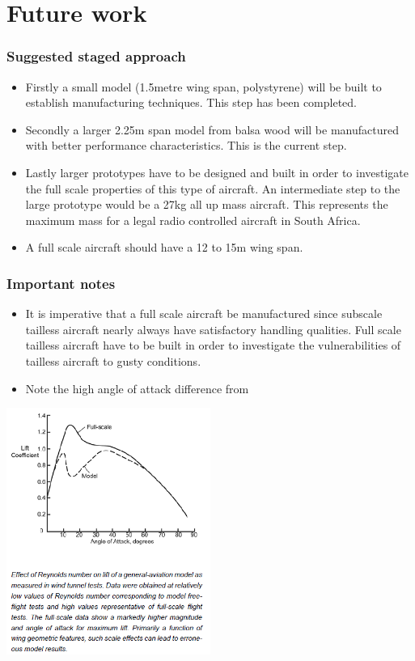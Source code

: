 \documentclass{beamer}
\begin{document}
\section{Future work}


\begin{frame}
\frametitle{Suggested staged approach}

\begin{itemize}
\item Firstly a small model (1.5metre wing span, polystyrene) will be built to establish manufacturing techniques.  This step has been completed.
\item Secondly a larger 2.25m span model from balsa wood will be manufactured with better performance characteristics.  This is the current step.
\item Lastly larger prototypes have to be designed and built in order to investigate the full scale properties of this type of aircraft.  An intermediate step to the large prototype would be a 27kg all up mass aircraft.  This represents the maximum mass for a legal radio controlled aircraft in South Africa.
\item A full scale aircraft should have a 12 to 15m wing span.  
\end{itemize}

\end{frame}


\begin{frame}
\frametitle{Important notes}

\begin{itemize}
\item It is imperative that a full scale aircraft 
be manufactured since subscale tailless aircraft nearly always have satisfactory handling qualities.  Full scale tailless aircraft 
have to be built in order to investigate the vulnerabilities of tailless aircraft to gusty conditions.
\item Note the high angle of attack difference from \cite{ModelFlightNASA}
\end{itemize}

\includegraphics[width = 0.5\textwidth]{Pictures/ModelAeroVSFullSize.png}

\end{frame}
\end{document}
